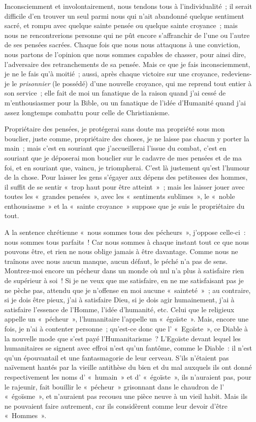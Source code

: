 \documentclass[french,twoside]{book} %
\begin{document}
Inconsciemment et involontairement, nous tendons tous à l’individualité ; il serait difficile d’en trouver un seul parmi nous qui n’ait abandonné quelque sentiment sacré, et rompu avec quelque sainte pensée ou quelque sainte croyance ; mais nous ne rencontrerions personne qui ne pût encore s’affranchir de l’une ou l’autre de ses pensées sacrées. Chaque fois que nous nous attaquons à une conviction, nous partons de l’opinion que nous sommes capables de chasser, pour ainsi dire, l’adversaire des retranchements de sa pensée. Mais ce que je fais inconsciemment, je ne le fais qu’à moitié ; aussi, après chaque victoire sur une croyance, redeviens-je le \emph{prisonnier }(le possédé) d’une nouvelle croyance, qui me reprend tout entier à son service ; elle fait de moi un fanatique de la raison quand j’ai cessé de m’enthousiasmer pour la Bible, ou un fanatique de l’idée d’Humanité quand j’ai assez longtemps combattu pour celle de Christianisme.\par
Propriétaire des pensées, je protégerai sans doute ma propriété sous mon bouclier, juste comme, propriétaire des choses, je ne laisse pas chacun y porter la main ; mais c’est en souriant que j’accueillerai l’issue du combat, c’est en souriant que je déposerai mon bouclier sur le cadavre de mes pensées et de ma foi, et en souriant que, vaincu, je triompherai. C’est là justement qu’est l’humour de la chose. Pour laisser les gens s’égayer aux dépens des petitesses des hommes, il suffit de se sentir « trop haut pour être atteint » ; mais les laisser jouer avec toutes les « grandes pensées », avec les « sentiments sublimes », le « noble enthousiasme » et la « sainte croyance » suppose que je suis le propriétaire du tout.\par
A la sentence chrétienne « nous sommes tous des pécheurs », j’oppose celle-ci : nous sommes tous parfaits ! Car nous sommes à chaque instant tout ce que  nous pouvons être, et rien ne nous oblige jamais à être davantage. Comme nous ne traînons avec nous aucun manque, aucun défaut, le péché n’a pas de sens. Montrez-moi encore un pécheur dans un monde où nul n’a plus à satisfaire rien de supérieur à soi ! Si je ne veux que me satisfaire, en ne me satisfaisant pas je ne pèche pas, attendu que je n’offense en moi aucune « sainteté » ; au contraire, si je dois être pieux, j’ai à satisfaire Dieu, si je dois agir humainement, j’ai à satisfaire l’essence de l’Homme, l’idée d’humanité, etc. Celui que le religieux appelle un « pécheur », l’humanitaire l’appelle un « égoïste ». Mais, encore une fois, je n’ai à contenter personne ; qu’est-ce donc que l’ « Egoïste », ce Diable à la nouvelle mode que s’est payé l’Humanitarisme ? L’Egoïste devant lequel les humanitaires se signent avec effroi n’est qu’un fantôme, comme le Diable : il n’est qu’un épouvantail et une fantasmagorie de leur cerveau. S’ils n’étaient pas naïvement hantés par la vieille antithèse du bien et du mal auxquels ils ont donné respectivement les noms d’ « humain » et d’ « égoïste », ils n’auraient pas, pour le rajeunir, fait bouillir le « pécheur » grisonnant dans le chaudron de l’ « égoïsme », et n’auraient pas recousu une pièce neuve à un vieil habit. Mais ils ne pouvaient faire autrement, car ils considèrent comme leur devoir d’être « Hommes ».\par
\end{document}
